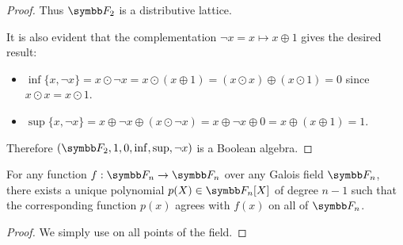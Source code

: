 \begin{proof}
  Thus \( \BF_2 \) is a distributive lattice.

  It is also evident that the complementation \( \neg x = x \mapsto x \oplus 1 \) gives the desired result:
  \begin{itemize}
    \item \( \inf \{ x, \neg x \} = x \odot \neg x = x \odot (x \oplus 1) = (x \odot x) \oplus (x \odot 1) = 0 \) since \( x \odot x = x \odot 1 \).
    \item \( \sup \{ x, \neg x \} = x \oplus \neg x \oplus (x \odot \neg x) = x \oplus \neg x \oplus 0 = x \oplus (x \oplus 1) = 1 \).
  \end{itemize}

  Therefore \( (\BF_2, 1, 0, \inf, \sup, \neg x ) \) is a Boolean algebra.
\end{proof}

\begin{proposition}
  For any function \( f: \BF_n \to \BF_n \) over any Galois field \( \BF_n \), there exists a unique polynomial \( p(X) \in \BF_n[X] \) of degree \( n - 1 \) such that the corresponding function \( p(x) \) agrees with \( f(x) \) on all of \( \BF_n \).
\end{proposition}
\begin{proof}
  We simply use  on all points of the field.
\end{proof}

